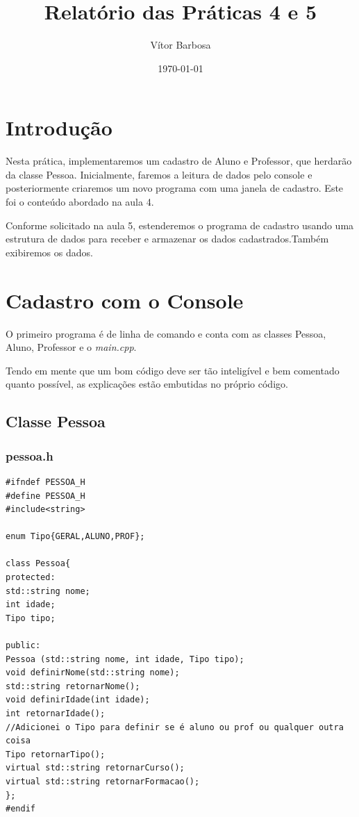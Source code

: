 \documentclass[12pt,a4paper]{article}
\title{Relatório das Práticas 4 e 5}
\author{Vítor Barbosa}
\date{\today}
\begin{document}
\maketitle
\section{Introdução}
Nesta prática, implementaremos um cadastro de Aluno e Professor, que herdarão da classe Pessoa. Inicialmente, faremos a leitura de dados pelo console e posteriormente criaremos um novo programa com uma janela de cadastro. Este foi o conteúdo abordado na aula 4.

Conforme solicitado na aula 5, estenderemos o programa de cadastro usando uma estrutura de dados para receber e armazenar os dados cadastrados.Também exibiremos os dados. 

\section{Cadastro com o Console}
O primeiro programa é de linha de comando e conta com as classes Pessoa, Aluno, Professor e o \emph{main.cpp}.

Tendo em mente que um bom código deve ser tão inteligível e bem comentado quanto possível, as explicações estão embutidas no próprio código.
\subsection*{Classe Pessoa}
\subsubsection*{pessoa.h}
\begin{verbatim}
#ifndef PESSOA_H
#define PESSOA_H
#include<string>

enum Tipo{GERAL,ALUNO,PROF};

class Pessoa{
protected:
std::string nome;
int idade;
Tipo tipo;

public:
Pessoa (std::string nome, int idade, Tipo tipo);
void definirNome(std::string nome);
std::string retornarNome();
void definirIdade(int idade);
int retornarIdade();
//Adicionei o Tipo para definir se é aluno ou prof ou qualquer outra coisa
Tipo retornarTipo();
virtual std::string retornarCurso();
virtual std::string retornarFormacao();
};
#endif
\end{verbatim}
\end{document}
